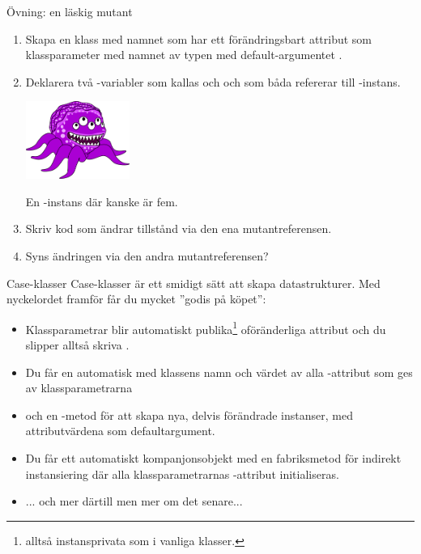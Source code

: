 \begin{Slide}{Övning: en läskig mutant}\SlideFontSmall
\begin{enumerate}
\item Skapa en klass med namnet  som har ett förändringsbart attribut som klassparameter med namnet  av typen  med default-argumentet .
\vspace{0.5em}

\item \begin{minipage}{0.5\textwidth}
Deklarera två -variabler som kallas  och  och som båda refererar till  -instans.
\end{minipage}
\hfill\begin{minipage}{0.32\textwidth}
\hfill\includegraphics[width=3.4cm]{../img/mutant.png}

En -instans där  kanske är fem.
\vspace{1em}
\end{minipage}

\item Skriv kod som ändrar tillstånd via den ena mutantreferensen.

\item Syns ändringen via den andra mutantreferensen?
\end{enumerate}
\end{Slide}




\begin{Slide}{Case-klasser}
Case-klasser är ett smidigt sätt att skapa  datastrukturer. Med nyckelordet  framför  får du mycket ''godis på köpet'':

\begin{itemize}
\item Klassparametrar blir automatiskt publika\footnote{alltså  instansprivata som i vanliga klasser.} oföränderliga attribut och du slipper alltså skriva .
\item Du får en automatisk  med klassens namn och värdet av alla -attribut som ges av klassparametrarna 
\item och en -metod för att skapa nya, delvis förändrade instanser, med attributvärdena som defaultargument.
\item Du får ett automatiskt kompanjonsobjekt med en fabriksmetod  för indirekt instansiering där alla klassparametrarnas -attribut initialiseras.
\pause
\item ... och mer därtill men mer om det senare...
\end{itemize}
\end{Slide}




